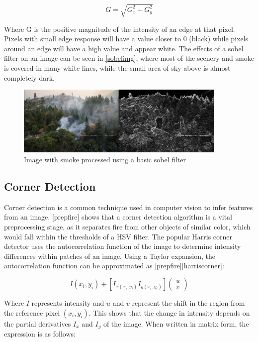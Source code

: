 \[G = \sqrt{G_{x}^{2} + G_{y}^{2}}\]

Where G is the positive magnitude of the intensity of an edge at that
pixel. Pixels with small edge response will have a value closer to 0
(black) while pixels around an edge will have a high value and appear
white. The effects of a sobel filter on an image can be seen in
\hyperref[sobelimg]{{[}sobelimg{]}}, where most of the scenery and smoke
is covered in many white lines, while the small area of sky above is
almost completely dark.

\begin{figure}
\centering
\includegraphics[width=0.9\textwidth,height=\textheight]{sobelsmoke.png}
\caption{Image with smoke processed using a basic sobel filter}
\end{figure}

\label{sobelimg}{}

\subsection{Corner Detection}

Corner detection is a common technique used in computer vision to infer
features from an image. {[}prepfire{]} shows that a corner detection
algorithm is a vital preprocessing stage, as it separates fire from
other objects of similar color, which would fall within the thresholds
of a HSV filter. The popular Harris corner detector uses the
autocorrelation function of the image to determine intensity differences
within patches of an image. Using a Taylor expansion, the
autocorrelation function can be approximated as
{[}prepfire{]}{[}harriscorner{]}:

\[I\left( x_{i},y_{i} \right) + \left\lbrack I_{x\left( x_{i},y_{i} \right)}I_{y\left( x_{i},y_{i} \right)} \right\rbrack\begin{pmatrix}
u \\
v
\end{pmatrix}\]

Where \(I\) represents intensity and \(u\) and \(v\) represent the shift
in the region from the reference pixel \(\left( x_{i},y_{i} \right)\).
This shows that the change in intensity depends on the partial
derivatives \(I_{x}\) and \(I_{y}\) of the image. When written in matrix
form, the expression is as follows:

